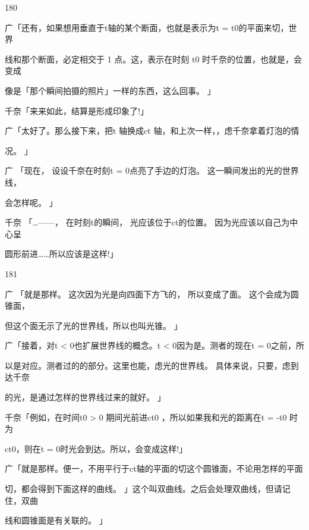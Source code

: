 180\par
广「还有，如果想用垂直于t轴的某个断面，也就是表示为t = t0的平面来切，世界\par
线和那个断面，必定相交于 1 点。这，表示在时刻 t0 时千奈的位置，也就是，会变成\par
像是「那个瞬间拍摄的照片」一样的东西，这么回事。 」\par
千奈「来来如此，结算是形成印象了!」\par
广「太好了。那么接下来，把t 轴换成ct 轴，和上次一样，，虑千奈拿着灯泡的情\par
况。 」\par
广 「现在， 设设千奈在时刻t = 0点亮了手边的灯泡。 这一瞬间发出的光的世界线，\par
会怎样呢。 」\par
千奈 「…——， 在时刻t的瞬间， 光应该位于ct的位置。 因为光应该以自己为中心呈\par
圆形前进……所以应该是这样!」\par

181\par
广 「就是那样。 这次因为光是向四面下方飞的， 所以变成了面。 这个会成为圆锥面，\par
但这个面无示了光的世界线，所以也叫光锥。 」\par
广「接着，对t < 0也扩展世界线的概念。t < 0因为是。测者的现在t = 0之前，所\par
以是对应。测者过的的部分。这里也能，虑光的世界线。 具体来说，只要，虑到达千奈\par
的光，是通过怎样的世界线过来的就好。 」\par
千奈「例如，在时间t0 > 0 期间光前进ct0 ，所以如果我和光的距离在t = -t0 时为\par
ct0，则在t = 0时光会到达。所以，会变成这样!」\par
广「就是那样。便一，不用平行于ct轴的平面的切这个圆锥面，不论用怎样的平面\par
切，都会得到下面这样的曲线。 」这个叫双曲线。之后会处理双曲线，但请记住，双曲\par
线和圆锥面是有关联的。 」\par

